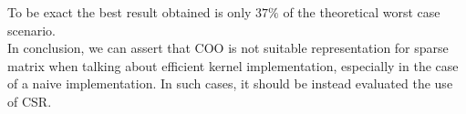 \documentclass[conference]{IEEEtran}
\begin{document}
To be exact the best result obtained is only $37\%$ of the theoretical worst case scenario.
\\

In conclusion, we can assert that COO is not suitable representation for sparse matrix when talking about efficient kernel implementation, especially in the case of a naive implementation. In such cases, it should be instead evaluated the use of CSR.
\end{document}
